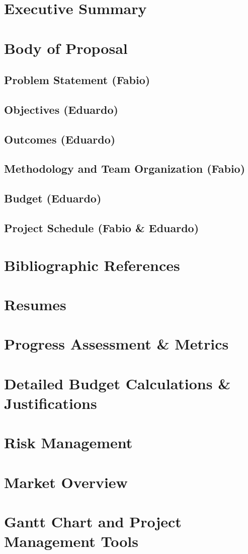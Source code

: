 \documentclass{article}
\begin{document}
 
 \section*{Executive Summary}
 \tableofcontents
 \newpage
 \section{Body of Proposal} 
 \subsection{Problem Statement (Fabio)}
 \subsection{Objectives (Eduardo)}
 \subsection{Outcomes (Eduardo)}
 \subsection{Methodology and Team Organization (Fabio)}
 \subsection{Budget (Eduardo)}
 \subsection{Project Schedule (Fabio \& Eduardo)}
 \section{Bibliographic References}
 \appendix
 \section{Resumes}
 \section{Progress Assessment \& Metrics}
 \section{Detailed Budget Calculations \& Justifications}
 \section{Risk Management}
 \section{Market Overview}
 \section{Gantt Chart and Project Management Tools}
\end{document}
